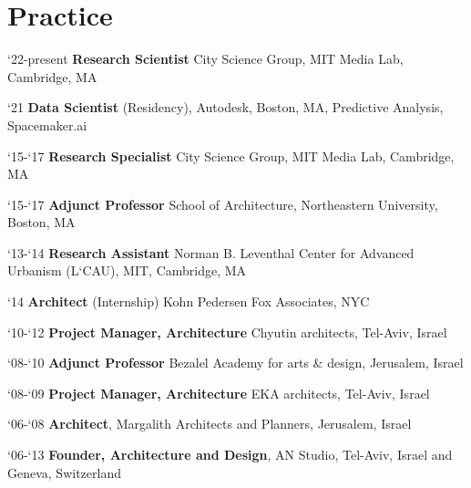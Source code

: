 \section*{Practice}

\begin{tablist}
   \item[`22-present]\tab\textbf{Research Scientist}
   City Science Group, MIT Media Lab, Cambridge, MA 

   \item[`21]\tab\textbf{Data Scientist} (Residency),
   Autodesk, Boston, MA, Predictive Analysis, Spacemaker.ai

    \item[`15-`17]\tab\textbf{Research Specialist}
   City Science Group, MIT Media Lab, Cambridge, MA

   \item[`15-`17]\tab\textbf{Adjunct Professor}
   School of Architecture, Northeastern University, Boston, MA

   \item[`13-`14]\tab\textbf{Research Assistant}
   Norman B. Leventhal Center for Advanced Urbanism (L`CAU), MIT, Cambridge, MA

   \item[`14]\tab\textbf{Architect} (Internship)
   Kohn Pedersen Fox Associates, NYC

   \item[`10-`12]\tab
   \textbf{Project Manager, Architecture} Chyutin architects, Tel-Aviv, Israel

   \item[`08-`10]\tab\textbf{Adjunct Professor}
   Bezalel Academy for arts \& design, Jerusalem, Israel

   \item[`08-`09]\tab\textbf{Project Manager, Architecture}
   EKA architects, Tel-Aviv, Israel

   \item[`06-`08]\tab\textbf{Architect},
   Margalith Architects and Planners, Jerusalem, Israel

   \item[`06-`13]\tab
   \textbf{Founder, Architecture and Design},
   AN Studio, Tel-Aviv, Israel and Geneva, Switzerland
\end{tablist}
